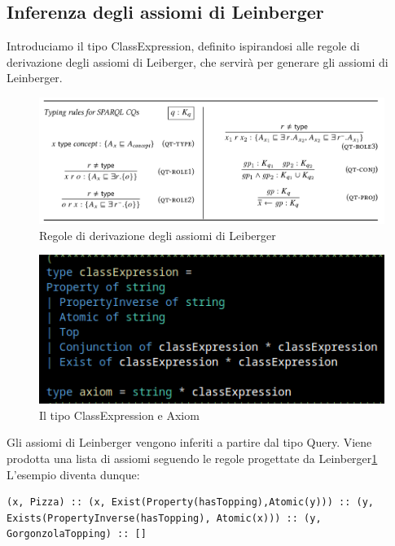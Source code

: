\subsection{Inferenza degli assiomi di Leinberger}
Introduciamo il tipo ClassExpression, definito ispirandosi alle regole di derivazione degli assiomi di Leiberger, che servirà per generare gli assiomi di Leinberger.
\begin{figure}[H]
    \centering
    \includegraphics[width=\textwidth]{pictures/leinbergAxiom.png}
    \caption{Regole di derivazione degli assiomi di Leiberger}
    \label{fig:leinbergerAxiom}
\end{figure}

\begin{figure}[H]
    \centering
    \includegraphics[width=\textwidth]{pictures/classExpressionType.png}
    \caption{Il tipo ClassExpression e Axiom}
    \label{fig:enter-label}
\end{figure}
Gli assiomi di Leinberger vengono inferiti a partire dal tipo Query. Viene prodotta una lista di assiomi seguendo le regole progettate da Leinberger\ref{fig:leinbergerAxiom} \\

L'esempio diventa dunque:
\begin{verbatim}
(x, Pizza) :: (x, Exist(Property(hasTopping),Atomic(y))) :: (y, Exists(PropertyInverse(hasTopping), Atomic(x))) :: (y, GorgonzolaTopping) :: []
\end{verbatim}


